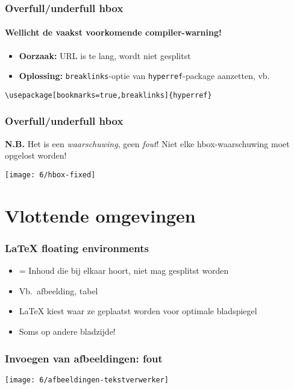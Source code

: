 \documentclass[aspectratio=169]{beamer}
\begin{document}
\begin{frame}[fragile]
  \frametitle{Overfull/underfull hbox}
  \framesubtitle{Wellicht de vaakst voorkomende compiler-warning!}

  \begin{itemize}
    \item \textbf{Oorzaak:} URL is te lang, wordt niet gesplitst
    \item \textbf{Oplossing:} \texttt{breaklinks}-optie van \texttt{hyperref}-package aanzetten, vb.
  \end{itemize}

\begin{verbatim}
\usepackage[bookmarks=true,breaklinks]{hyperref}
\end{verbatim}
\end{frame}

\begin{frame}
  \frametitle{Overfull/underfull hbox}

  \textbf{N.B.} Het is een \emph{waarschuwing}, geen \emph{fout}! Niet elke hbox-waarschuwing moet opgelost worden!

  \centering
  \texttt{[image: 6/hbox-fixed]}

\end{frame}

\section{Vlottende omgevingen}

\begin{frame}
  \frametitle{{\LaTeX} floating environments}

  \begin{itemize}
    \item = Inhoud die bij elkaar hoort, niet mag gesplitst worden
    \item Vb.\ afbeelding, tabel
    \item {\LaTeX} kiest waar ze geplaatst worden voor optimale bladspiegel
    \item Soms op andere bladzijde!
  \end{itemize}

\end{frame}

\begin{frame}
  \frametitle{Invoegen van afbeeldingen: fout}

  \centering
  \texttt{[image: 6/afbeeldingen-tekstverwerker]}

\end{frame}
\end{document}
